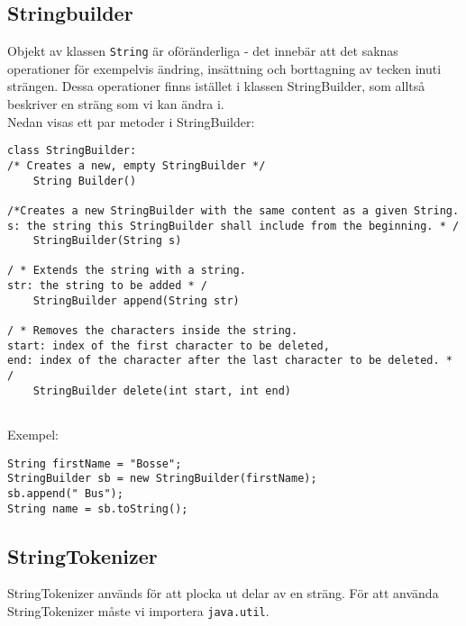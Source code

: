 \documentclass[11pt]{article}
\begin{document}
\subsection{Stringbuilder}
Objekt av klassen \verb+String+ är oföränderliga - det innebär att det saknas operationer för exempelvis ändring, insättning och borttagning av tecken inuti strängen. Dessa operationer finns istället i klassen StringBuilder, som alltså beskriver en sträng som vi kan ändra i. \\
Nedan visas ett par metoder i StringBuilder:
\begin{lstlisting}
class StringBuilder:
/* Creates a new, empty StringBuilder */
	String Builder()

/*Creates a new StringBuilder with the same content as a given String.
s: the string this StringBuilder shall include from the beginning. * /
	StringBuilder(String s)

/ * Extends the string with a string. 
str: the string to be added * /
	StringBuilder append(String str)
	
/ * Removes the characters inside the string. 
start: index of the first character to be deleted, 
end: index of the character after the last character to be deleted. * /
	StringBuilder delete(int start, int end)
	
\end{lstlisting} 
Exempel:
\begin{lstlisting}
String firstName = "Bosse";
StringBuilder sb = new StringBuilder(firstName);
sb.append(" Bus");
String name = sb.toString();
\end{lstlisting} 
\subsection{StringTokenizer}
StringTokenizer används för att plocka ut delar av en sträng. 
För att använda StringTokenizer måste vi importera \verb+java.util+.
\end{document}
